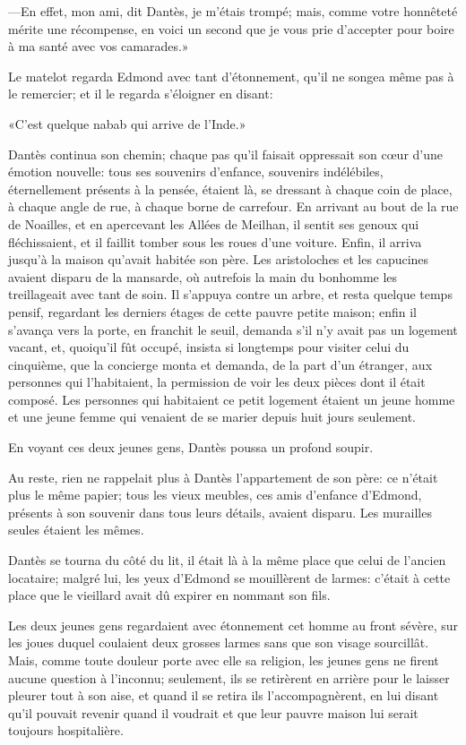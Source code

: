 —En effet, mon ami, dit Dantès, je m'étais trompé; mais, comme votre honnêteté mérite une récompense, en voici un second que je vous prie d'accepter pour boire à ma santé avec vos camarades.»

Le matelot regarda Edmond avec tant d'étonnement, qu'il ne songea même pas à le remercier; et il le regarda s'éloigner en disant:

«C'est quelque nabab qui arrive de l'Inde.»

Dantès continua son chemin; chaque pas qu'il faisait oppressait son cœur d'une émotion nouvelle: tous ses souvenirs d'enfance, souvenirs indélébiles, éternellement présents à la pensée, étaient là, se dressant à chaque coin de place, à chaque angle de rue, à chaque borne de carrefour. En arrivant au bout de la rue de Noailles, et en apercevant les Allées de Meilhan, il sentit ses genoux qui fléchissaient, et il faillit tomber sous les roues d'une voiture. Enfin, il arriva jusqu'à la maison qu'avait habitée son père. Les aristoloches et les capucines avaient disparu de la mansarde, où autrefois la main du bonhomme les treillageait avec tant de soin. Il s'appuya contre un arbre, et resta quelque temps pensif, regardant les derniers étages de cette pauvre petite maison; enfin il s'avança vers la porte, en franchit le seuil, demanda s'il n'y avait pas un logement vacant, et, quoiqu'il fût occupé, insista si longtemps pour visiter celui du cinquième, que la concierge monta et demanda, de la part d'un étranger, aux personnes qui l'habitaient, la permission de voir les deux pièces dont il était composé. Les personnes qui habitaient ce petit logement étaient un jeune homme et une jeune femme qui venaient de se marier depuis huit jours seulement.

En voyant ces deux jeunes gens, Dantès poussa un profond soupir.

Au reste, rien ne rappelait plus à Dantès l'appartement de son père: ce n'était plus le même papier; tous les vieux meubles, ces amis d'enfance d'Edmond, présents à son souvenir dans tous leurs détails, avaient disparu. Les murailles seules étaient les mêmes.

Dantès se tourna du côté du lit, il était là à la même place que celui de l'ancien locataire; malgré lui, les yeux d'Edmond se mouillèrent de larmes: c'était à cette place que le vieillard avait dû expirer en nommant son fils.

Les deux jeunes gens regardaient avec étonnement cet homme au front sévère, sur les joues duquel coulaient deux grosses larmes sans que son visage sourcillât. Mais, comme toute douleur porte avec elle sa religion, les jeunes gens ne firent aucune question à l'inconnu; seulement, ils se retirèrent en arrière pour le laisser pleurer tout à son aise, et quand il se retira ils l'accompagnèrent, en lui disant qu'il pouvait revenir quand il voudrait et que leur pauvre maison lui serait toujours hospitalière.

